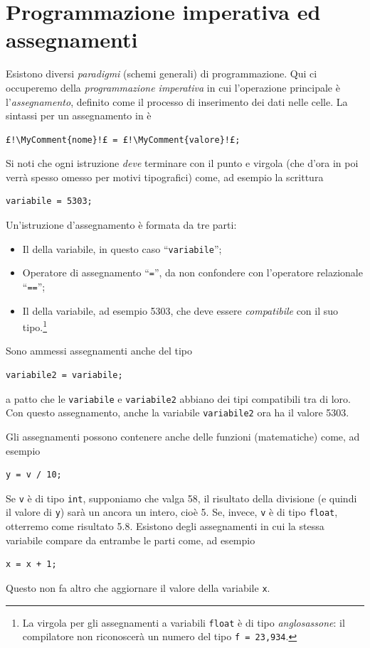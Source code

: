 	\section{Programmazione imperativa ed assegnamenti}
Esistono diversi \emph{paradigmi} (schemi generali) di programmazione.
Qui ci occuperemo della \emph{programmazione imperativa} in cui l'operazione principale è l'\emph{assegnamento}, definito come il processo di inserimento dei dati nelle celle.
La sintassi per un assegnamento in  è 
\begin{lstlisting}
£!\MyComment{nome}!£ = £!\MyComment{valore}!£;
\end{lstlisting}
Si noti che ogni istruzione \emph{deve} terminare con il punto e virgola (che d'ora in poi verrà spesso omesso per motivi tipografici) come, ad esempio la scrittura
\begin{lstlisting}
variabile = 5303;
\end{lstlisting}
Un'istruzione d'assegnamento è formata da tre parti:
\begin{itemize}
	\item
Il  della variabile, in questo caso ``\lstinline!variabile!'';
	\item
Operatore di assegnamento ``\lstinline!=!'', da non confondere con l'operatore relazionale ``\lstinline!==!'';
	\item
Il  della variabile, ad esempio \num{5303}, che deve essere \emph{compatibile} con il suo tipo.\footnote{%
La virgola per gli assegnamenti a variabili \lstinline!float! è di tipo \emph{anglosassone}: il compilatore non riconoscerà un numero del tipo \lstinline!f = 23,934!.
}
\end{itemize}
Sono ammessi assegnamenti anche del tipo
\begin{lstlisting}
variabile2 = variabile;
\end{lstlisting}
a patto che le \lstinline!variabile! e \lstinline!variabile2! abbiano dei tipi compatibili tra di loro.
Con questo assegnamento, anche la variabile \lstinline!variabile2! ora ha il valore \num{5303}.


Gli assegnamenti possono contenere anche delle funzioni (matematiche) come, ad esempio
\begin{lstlisting}
y = v / 10;
\end{lstlisting}
Se \lstinline!v! è di tipo \lstinline!int!, supponiamo che valga \num{58}, il risultato della divisione (e quindi il valore di \lstinline!y!) sarà un ancora un intero, cioè \num{5}.
Se, invece, \lstinline!v! è di tipo \lstinline!float!, otterremo come risultato \num{5.8}.
Esistono degli assegnamenti in cui la stessa variabile compare da entrambe le parti come, ad esempio
\begin{lstlisting}
x = x + 1;
\end{lstlisting}
Questo non fa altro che aggiornare il valore della variabile \lstinline!x!.

